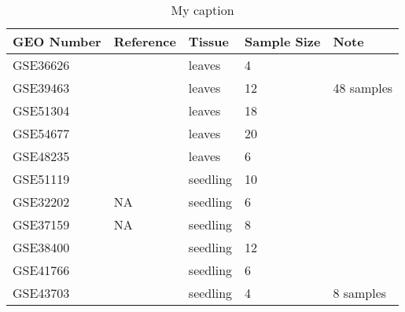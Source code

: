 \documentclass[letterpaper,12pt]{article}
\begin{document}
	
	
	\begin{table}[!ht]
		\small
		\centering
		\caption{My caption}
		\label{my-label}
		\begin{tabular}{p{2.5cm}p{2cm}p{4.5cm}p{1cm}p{4cm}} \\ \hline
			GEO Number & Reference                     & Tissue                                                   & Sample Size & Note                   \\  \hline
			GSE36626   & \cite{wollmann2012dynamic}           & leaves                                                   & 4           &                        \\
			GSE39463   & \cite{maekawa2012conservation}       & leaves                                                   & 12          & 48 samples \\
			GSE51304   & \cite{stroud2014non}                & leaves                                                   & 18          &                        \\
			GSE54677   & \cite{moissiard2014transcriptional}  & leaves                                                   & 20          &                        \\
			GSE48235   & \cite{liu2014different}              & leaves                                                   & 6           &                        \\  \hline
			GSE51119   & \cite{zhiponova2014helix}            & seedling                                                 & 10          &                        \\
			GSE32202   & NA                            & seedling                                                 & 6           &                        \\
			GSE37159   & NA                            & seedling                                                 & 8           &                        \\
			GSE38400   & \cite{zhu2013swi}                    & seedling                                                 & 12          &                        \\
			GSE41766   & \cite{bai2012triple}                 & seedling                                                 & 6           &                        \\
			GSE43703   & \cite{liu2013translational}          & seedling                                                 & 4           & 8 samples              \\

\end{tabular}
\end{table}
\end{document}
